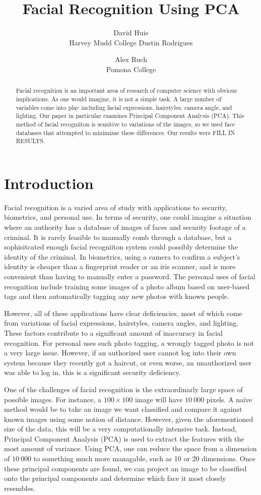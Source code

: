 \documentclass[letterpaper]{article}
\title{Facial Recognition Using PCA}
\author{David Huie \\ Harvey Mudd College \And Dustin Rodrigues \and
Alex Ruch \\ Pomona College}
\begin{document}
\nocopyright
\maketitle
\begin{abstract}
Facial recognition is an important area of research of computer science with obvious implications. As one would imagine, it is not a simple task.  A large number of variables come into play including facial expressions, hairstyles, camera angle, and lighting. Our paper in particular examines Principal Component Analysis (PCA).  This method of facial recogniiton is sensitive to variations of the images, so we used face databases that attempted to minimizae these differences. Our results were FILL IN RESULTS. 
\end{abstract}
\section{Introduction}
Facial recognition is a varied area of study with applications to security, biometrics, and personal use.  In terms of security, one could imagine a situation where an authority has a database of images of faces and security footage of a criminal.  It is rarely feasible to manually comb through a database, but a sophisitcated enough facial recogniiton system could possibly determine the identity of the criminal.  In biometrics, using a camera to confirm a subject's identity is cheaper than a fingerprint reader or an iris scanner, and is more convenient than having to manually enter a password.  The personal uses of facial recognition include training some images of a photo album based on user-based tags and then automatically tagging any new photos with known people.

However, all of these applications have clear deficiencies, most of which come from variations of facial expressions, hairstyles, camera angles, and lighting.  These factors contribute to a significant amount of inaccuracy in facial recognition. For personal uses such photo tagging, a wrongly tagged photo is not a very large issue.  However, if an authorized user cannot log into their own system because they recently got a haircut, or even worse, an unauthorized user was able to log in, this is a significant security deficiency. 

One of the challenges of facial recognition is the extraordinarly large space of possible images.  For instance, a $100\times100$ image will have $10\ 000$ pixels. A na\"ive method would be to take an image we want classified and compare it against known images using some notion of distance.  However, given the aforementioned size of the data, this will be a very computationally intensive task.  Instead, Principal Component Analysis (PCA) is used to extract the features with the most amount of variance. Using PCA, one can reduce the space from a dimension of $10\ 000$ to something much more managable, such as 10 or 20 dimensions.  Once these principal components are found, we can project an image to be classified onto the principal components and determine which face it most closely resembles.
\end{document}
